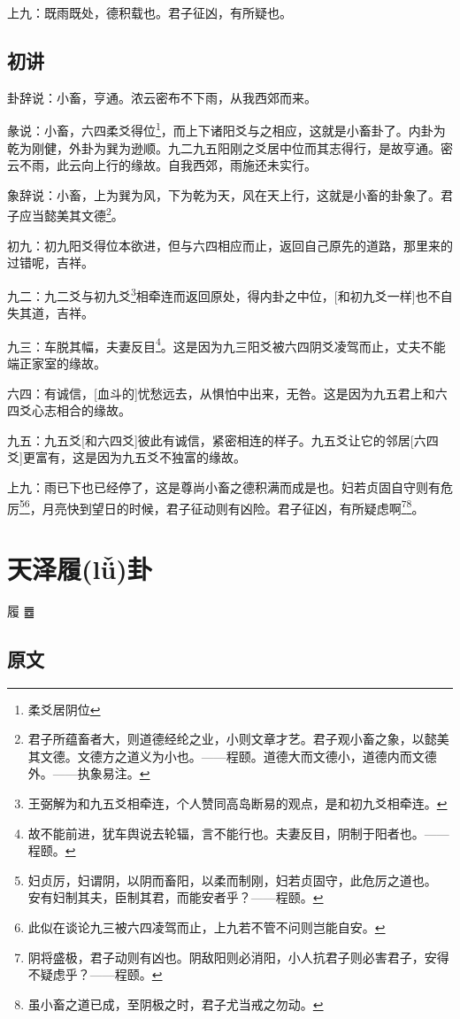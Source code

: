\documentclass[12pt,oneside]{book}
\begin{document}
上九：既雨既处，德积载也。君子征凶，有所疑也。


\section{初讲}
卦辞说：小畜，亨通。浓云密布不下雨，从我西郊而来。

彖说：小畜，六四柔爻得位\footnote{柔爻居阴位}，而上下诸阳爻与之相应，这就是小畜卦了。内卦为乾为刚健，外卦为巽为逊顺。九二九五阳刚之爻居中位而其志得行，是故亨通。密云不雨，此云向上行的缘故。自我西郊，雨施还未实行。

象辞说：小畜，上为巽为风，下为乾为天，风在天上行，这就是小畜的卦象了。君子应当懿美其文德\footnote{君子所蕴畜者大，则道德经纶之业，小则文章才艺。君子观小畜之象，以懿美其文德。文德方之道义为小也。——程颐。道德大而文德小，道德内而文德外。——执象易注。}。

初九：初九阳爻得位本欲进，但与六四相应而止，返回自己原先的道路，那里来的过错呢，吉祥。

九二：九二爻与初九爻\footnote{王弼解为和九五爻相牵连，个人赞同高岛断易的观点，是和初九爻相牵连。}相牵连而返回原处，得内卦之中位，[和初九爻一样]也不自失其道，吉祥。

九三：车脱其幅，夫妻反目\footnote{故不能前进，犹车舆说去轮辐，言不能行也。夫妻反目，阴制于阳者也。——程颐。}。这是因为九三阳爻被六四阴爻凌驾而止，丈夫不能端正家室的缘故。

六四：有诚信，[血斗的]忧愁远去，从惧怕中出来，无咎。这是因为九五君上和六四爻心志相合的缘故。

九五：九五爻[和六四爻]彼此有诚信，紧密相连的样子。九五爻让它的邻居[六四爻]更富有，这是因为九五爻不独富的缘故。

上九：雨已下也已经停了，这是尊尚小畜之德积满而成是也。妇若贞固自守则有危厉\footnote{ 妇贞厉，妇谓阴，以阴而畜阳，以柔而制刚，妇若贞固守，此危厉之道也。 安有妇制其夫，臣制其君，而能安者乎？——程颐。}\footnote{此似在谈论九三被六四凌驾而止，上九若不管不问则岂能自安。}，月亮快到望日的时候，君子征动则有凶险。君子征凶，有所疑虑啊\footnote{阴将盛极，君子动则有凶也。阴敌阳则必消阳，小人抗君子则必害君子，安得不疑虑乎？——程颐。}\footnote{虽小畜之道已成，至阴极之时，君子尤当戒之勿动。}。


\chapter{天泽履(lǚ)卦}
履 {\Large ䷉}

\section{原文}
\end{document}
